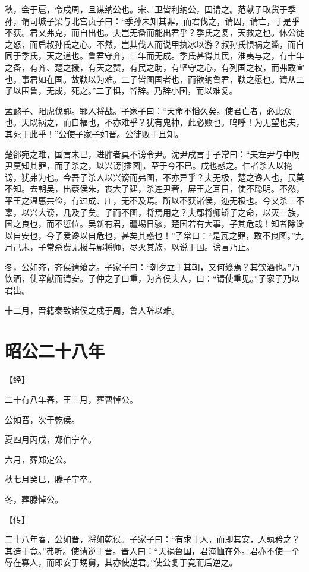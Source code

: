 \documentclass[a4paper,12pt,UTF8,twoside]{ctexbook}
\begin{document}
秋，会于扈，令戍周，且谋纳公也。宋、卫皆利纳公，固请之。范献子取货于季孙，谓司城子梁与北宫贞子曰：“季孙未知其罪，而君伐之，请囚，请亡，于是乎不获。君又弗克，而自出也。夫岂无备而能出君乎？季氏之复，天救之也。休公徒之怒，而启叔孙氏之心。不然，岂其伐人而说甲执冰以游？叔孙氏惧祸之滥，而自同于季氏，天之道也。鲁君守齐，三年而无成。季氏甚得其民，淮夷与之，有十年之备，有齐、楚之援，有天之赞，有民之助，有坚守之心，有列国之权，而弗敢宣也，事君如在国。故鞅以为难。二子皆图国者也，而欲纳鲁君，鞅之愿也。请从二子以围鲁，无成，死之。”二子惧，皆辞。乃辞小国，而以难复。

孟懿子、阳虎伐郓。郓人将战。子家子曰：“天命不慆久矣。使君亡者，必此众也。天既祸之，而自福也，不亦难乎？犹有鬼神，此必败也。呜呼！为无望也夫，其死于此乎！”公使子家子如晋。公徒败于且知。

楚郤宛之难，国言未已，进胙者莫不谤令尹。沈尹戌言于子常曰：“夫左尹与中厩尹莫知其罪，而子杀之，以兴谤[插图]，至于今不已。戌也惑之。仁者杀人以掩谤，犹弗为也。今吾子杀人以兴谤而弗图，不亦异乎？夫无极，楚之谗人也，民莫不知。去朝吴，出蔡侯朱，丧大子建，杀连尹奢，屏王之耳目，使不聪明。不然，平王之温惠共俭，有过成、庄，无不及焉。所以不获诸侯，迩无极也。今又杀三不辜，以兴大谤，几及子矣。子而不图，将焉用之？夫鄢将师矫子之命，以灭三族，国之良也，而不愆位。吴新有君，疆埸日骇，楚国若有大事，子其危哉！知者除谗以自安也，今子爱谗以自危也，甚矣其惑也！”子常曰：“是瓦之罪，敢不良图。”九月己未，子常杀费无极与鄢将师，尽灭其族，以说于国。谤言乃止。

冬，公如齐，齐侯请飨之。子家子曰：“朝夕立于其朝，又何飨焉？其饮酒也。”乃饮酒，使宰献而请安。子仲之子曰重，为齐侯夫人，曰：“请使重见。”子家子乃以君出。

十二月，晋籍秦致诸侯之戍于周，鲁人辞以难。


\chapter{昭公二十八年}



【经】

二十有八年春，王三月，葬曹悼公。

公如晋，次于乾侯。

夏四月丙戌，郑伯宁卒。

六月，葬郑定公。

秋七月癸巳，滕子宁卒。

冬，葬滕悼公。

【传】

二十八年春，公如晋，将如乾侯。子家子曰：“有求于人，而即其安，人孰矜之？其造于竟。”弗听。使请逆于晋。晋人曰：“天祸鲁国，君淹恤在外。君亦不使一个辱在寡人，而即安于甥舅，其亦使逆君。”使公复于竟而后逆之。
\end{document}
